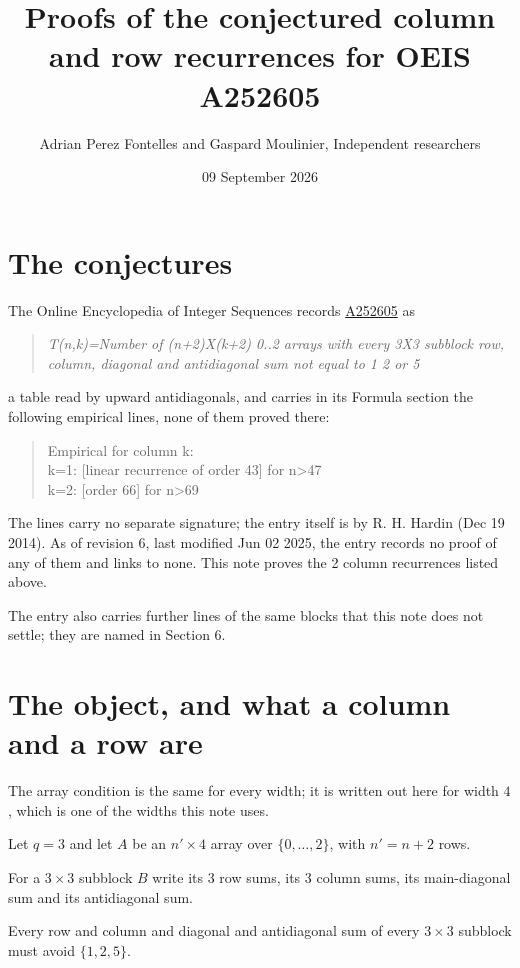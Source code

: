 \documentclass[11pt]{article}
\title{Proofs of the conjectured column and row recurrences for OEIS A252605}
\author{Adrian Perez Fontelles and Gaspard Moulinier, Independent researchers}
\date{09 September 2026}
\theoremstyle{definition}
\begin{document}
\maketitle
\section{The conjectures}

The Online Encyclopedia of Integer Sequences records \href{https://oeis.org/A252605}{A252605} as

\begin{quote}\itshape T(n,k)=Number of (n+2)X(k+2) 0..2 arrays with every 3X3 subblock row, column, diagonal and antidiagonal sum not equal to 1 2 or 5\end{quote}

a table read by upward antidiagonals, and carries in its Formula section the following empirical lines, none of them proved there:

\begin{quote}\ttfamily Empirical for column k:\\
k=1: [linear recurrence of order 43] for n>47\\k=2: [order 66] for n>69\end{quote}

The lines carry no separate signature; the entry itself is by R. H. Hardin (Dec 19 2014). As of revision 6, last modified Jun 02 2025, the entry records no proof of any of them and links to none. This note proves the 2 column recurrences listed above.

The entry also carries further lines of the same blocks that this note does not settle; they are named in Section 6.

\section{The object, and what a column and a row are}

The array condition is the same for every width; it is written out here for width $4$, which is one of the widths this note uses.

Let $q = 3$ and let $A$ be an $n' \times 4$ array over $\{0,\dots,2\}$, with $n' = n + 2$ rows.

For a $3\times3$ subblock $B$ write its 3 row sums, its 3 column sums, its main-diagonal sum and its antidiagonal sum.

Every row and column and diagonal and antidiagonal sum of every $3\times3$ subblock must avoid $\{1, 2, 5\}$.
\end{document}
